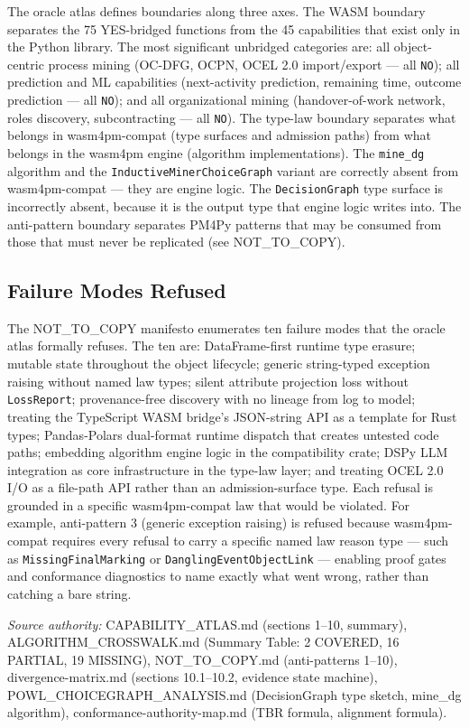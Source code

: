 The oracle atlas defines boundaries along three axes. The WASM boundary separates the 75
YES-bridged functions from the 45 capabilities that exist only in the Python library. The
most significant unbridged categories are: all object-centric process mining (OC-DFG,
OCPN, OCEL 2.0 import/export --- all \texttt{NO}); all prediction and ML capabilities
(next-activity prediction, remaining time, outcome prediction --- all \texttt{NO}); and
all organizational mining (handover-of-work network, roles discovery, subcontracting ---
all \texttt{NO}). The type-law boundary separates what belongs in wasm4pm-compat (type
surfaces and admission paths) from what belongs in the wasm4pm engine (algorithm
implementations). The \texttt{mine\_dg} algorithm and the \texttt{InductiveMinerChoiceGraph}
variant are correctly absent from wasm4pm-compat --- they are engine logic. The
\texttt{DecisionGraph} type surface is incorrectly absent, because it is the output
type that engine logic writes into. The anti-pattern boundary separates PM4Py patterns
that may be consumed from those that must never be replicated (see NOT\_TO\_COPY).

\subsection{Failure Modes Refused}
\label{sec:sources-pm4py-arch-failures}

The NOT\_TO\_COPY manifesto enumerates ten failure modes that the oracle atlas formally
refuses. The ten are: DataFrame-first runtime type erasure; mutable state throughout the
object lifecycle; generic string-typed exception raising without named law types; silent
attribute projection loss without \texttt{LossReport}; provenance-free discovery with no
lineage from log to model; treating the TypeScript WASM bridge's JSON-string API as a
template for Rust types; Pandas-Polars dual-format runtime dispatch that creates untested
code paths; embedding algorithm engine logic in the compatibility crate; DSPy LLM
integration as core infrastructure in the type-law layer; and treating OCEL 2.0 I/O as a
file-path API rather than an admission-surface type. Each refusal is grounded in a specific
wasm4pm-compat law that would be violated. For example, anti-pattern 3 (generic exception
raising) is refused because wasm4pm-compat requires every refusal to carry a specific
named law reason type --- such as \texttt{MissingFinalMarking} or
\texttt{DanglingEventObjectLink} --- enabling proof gates and conformance diagnostics to
name exactly what went wrong, rather than catching a bare string.

\bigskip
\noindent\textit{Source authority:} CAPABILITY\_ATLAS.md (sections 1--10, summary),
ALGORITHM\_CROSSWALK.md (Summary Table: 2 COVERED, 16 PARTIAL, 19 MISSING),
NOT\_TO\_COPY.md (anti-patterns 1--10), divergence-matrix.md (sections 10.1--10.2,
evidence state machine), POWL\_CHOICEGRAPH\_ANALYSIS.md (DecisionGraph type sketch,
mine\_dg algorithm), conformance-authority-map.md (TBR formula, alignment formula).
